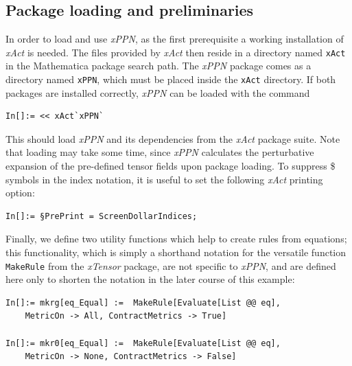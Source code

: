 \documentclass[notitlepage,a4paper,aps,prd,onecolumn,superscriptaddress,nofootinbib,groupedaddress,longbibliography]{revtex4-1}
\newcommand{\xPPN}{\emph{xPPN}}
\newcommand{\xAct}{\emph{xAct}}
\newcommand{\xTensor}{\emph{xTensor}}
\begin{document}
\subsection{Package loading and preliminaries}\label{ssec:loading}
In order to load and use \xPPN, as the first prerequisite a working installation of \xAct{} \cite{xact} is needed. The files provided by \xAct{} then reside in a directory named \texttt{xAct} in the Mathematica package search path. The \xPPN{} package comes as a directory named \texttt{xPPN}, which must be placed inside the \texttt{xAct} directory. If both packages are installed correctly, \xPPN{} can be loaded with the command
\begin{lstlisting}
In[]:= << xAct`xPPN`
\end{lstlisting}
This should load \xPPN{} and its dependencies from the \xAct{} package suite. Note that loading may take some time, since \xPPN{} calculates the perturbative expansion of the pre-defined tensor fields upon package loading. To suppress \$ symbols in the index notation, it is useful to set the following \xAct{} printing option:
\begin{lstlisting}
In[]:= §PrePrint = ScreenDollarIndices;
\end{lstlisting}
Finally, we define two utility functions which help to create rules from equations; this functionality, which is simply a shorthand notation for the versatile function \lstinline/MakeRule/ from the \xTensor{} package, are not specific to \xPPN, and are defined here only to shorten the notation in the later course of this example:
\begin{lstlisting}
In[]:= mkrg[eq_Equal] :=  MakeRule[Evaluate[List @@ eq],
	MetricOn -> All, ContractMetrics -> True]

In[]:= mkr0[eq_Equal] :=  MakeRule[Evaluate[List @@ eq],
	MetricOn -> None, ContractMetrics -> False]
\end{lstlisting}
\end{document}
